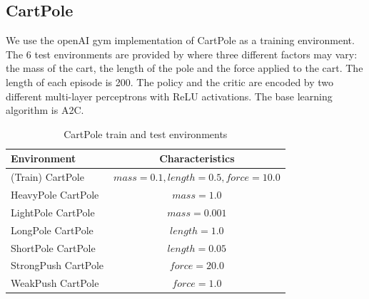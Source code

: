\newpage

\subsection{CartPole}
\label{subsec:cartpole}

We use the openAI gym implementation of CartPole as a training environment. The 6 test environments are provided by \cite{PackerGao:1810.12282} where three different factors may vary: the mass of the cart, the length of the pole and the force applied to the cart. The length of each episode is 200.  The policy and the critic are encoded by two different multi-layer perceptrons with ReLU activations. The base learning algorithm is A2C.

\begin{table}[h!]
\begin{center}
\begin{tabular}{l|c} \toprule
\textbf{Environment} & \textbf{Characteristics} \\ \hline
(Train) CartPole & $mass=0.1, length=0.5 ,force=10.0$ \\ \hline
HeavyPole CartPole & $mass=1.0$ \\
LightPole CartPole &  $mass=0.001$ \\
LongPole CartPole & $length=1.0$ \\
ShortPole CartPole & $length=0.05$ \\
StrongPush CartPole & $force=20.0$ \\
WeakPush CartPole &  $force=1.0$\\
\hline
\end{tabular}
\end{center}
\caption{CartPole train and test environments}
\end{table}


